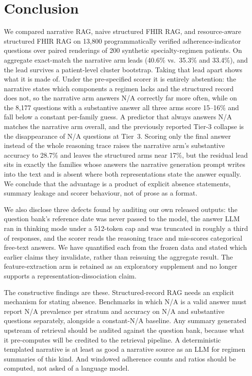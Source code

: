 
\section{Conclusion}
\label{sec:conclusion}

We compared narrative RAG, naive structured FHIR RAG, and resource-aware structured FHIR
RAG on 13,800 programmatically verified adherence-indicator questions over paired
renderings of 200 synthetic specialty-regimen patients.  On aggregate exact-match the
narrative arm leads (40.6\% vs.\ 35.3\% and 33.4\%), and the lead survives a
patient-level cluster bootstrap.  Taking that lead apart shows what it is made of.  Under
the pre-specified scorer it is entirely abstention: the narrative states which components
a regimen lacks and the structured record does not, so the narrative arm answers N/A
correctly far more often, while on the 8,177 questions with a substantive answer all
three arms score 15--16\% and fall below a constant per-family guess.  A predictor that
always answers N/A matches the narrative arm overall, and the previously reported Tier-3
collapse is the disappearance of N/A questions at Tier~3.  Scoring only the final answer
instead of the whole reasoning trace raises the narrative arm's substantive accuracy to
28.7\% and leaves the structured arms near 17\%, but the residual lead sits in exactly
the families whose answers the narrative generation prompt writes into the text and is
absent where both representations state the answer equally.  We conclude that the
advantage is a product of explicit absence statements, summary leakage and scorer
behaviour, not of prose as a format.

We also disclose three defects found by auditing our own released outputs: the question
bank's reference date was never passed to the model, the answer LLM ran in thinking mode
under a 512-token cap and was truncated in roughly a third of responses, and the scorer
reads the reasoning trace and mis-scores categorical free-text answers.  We have
quantified each from the frozen data and stated which earlier claims they invalidate,
rather than reissuing the aggregate result.  The feature-extraction arm is retained as an
exploratory supplement and no longer supports a representation-dissociation claim.

The constructive findings are these.  Structured-record RAG needs an explicit mechanism
for stating absence.  Benchmarks in which N/A is a valid answer must report N/A prevalence
per stratum and accuracy on N/A and substantive questions separately, alongside a
constant-N/A baseline.  Any summary generated upstream of retrieval should be audited
against the question bank, because what it pre-computes will be credited to the retrieval
pipeline.  A deterministic templated narrative is at least as good a narrative source as
an LLM for regimen summaries of this kind.  And windowed adherence counts and ratios
should be computed, not asked of a language model.

